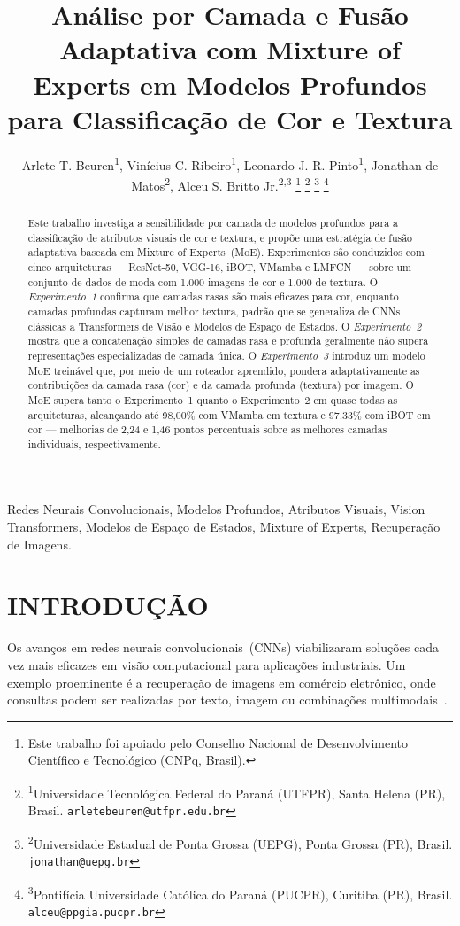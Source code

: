 \documentclass[letterpaper, 10 pt, conference]{ieeeconf}
\title{\LARGE \bf
Análise por Camada e Fusão Adaptativa com Mixture of Experts em Modelos
Profundos para Classificação de Cor e Textura
}
\author{
    Arlete T. Beuren\textsuperscript{1},
    Vinícius C. Ribeiro\textsuperscript{1},
    Leonardo J. R. Pinto\textsuperscript{1},
    Jonathan de Matos\textsuperscript{2},
    Alceu S. Britto Jr.\textsuperscript{2,3}%
    \thanks{Este trabalho foi apoiado pelo Conselho Nacional de
            Desenvolvimento Científico e Tecnológico (CNPq, Brasil).}%
    \thanks{\textsuperscript{1}Universidade Tecnológica Federal do Paraná
            (UTFPR), Santa Helena (PR), Brasil.
            \texttt{arletebeuren@utfpr.edu.br}}%
    \thanks{\textsuperscript{2}Universidade Estadual de Ponta Grossa (UEPG),
            Ponta Grossa (PR), Brasil.
            \texttt{jonathan@uepg.br}}%
    \thanks{\textsuperscript{3}Pontifícia Universidade Católica do Paraná
            (PUCPR), Curitiba (PR), Brasil.
            \texttt{alceu@ppgia.pucpr.br}}%
}
\begin{document}
\maketitle
\thispagestyle{empty}
\pagestyle{empty}

\begin{abstract}

Este trabalho investiga a sensibilidade por camada de modelos profundos
para a classificação de atributos visuais de cor e textura, e propõe uma
estratégia de fusão adaptativa baseada em Mixture of Experts~(MoE).
Experimentos são conduzidos com cinco arquiteturas — ResNet-50, VGG-16,
iBOT, VMamba e LMFCN — sobre um conjunto de dados de moda com 1.000
imagens de cor e 1.000 de textura.
O \emph{Experimento~1} confirma que camadas rasas são mais eficazes para
cor, enquanto camadas profundas capturam melhor textura, padrão que se
generaliza de CNNs clássicas a Transformers de Visão e Modelos de Espaço
de Estados.
O \emph{Experimento~2} mostra que a concatenação simples de camadas rasa e
profunda geralmente não supera representações especializadas de camada única.
O \emph{Experimento~3} introduz um modelo MoE treinável que, por meio de um
roteador aprendido, pondera adaptativamente as contribuições da camada rasa
(cor) e da camada profunda (textura) por imagem.
O MoE supera tanto o Experimento~1 quanto o Experimento~2 em quase todas as
arquiteturas, alcançando até 98,00\% com VMamba em textura e 97,33\% com
iBOT em cor — melhorias de 2,24 e 1,46 pontos percentuais sobre as melhores
camadas individuais, respectivamente.

\end{abstract}

\begin{IEEEkeywords}
Redes Neurais Convolucionais, Modelos Profundos, Atributos Visuais,
Vision Transformers, Modelos de Espaço de Estados, Mixture of Experts,
Recuperação de Imagens.
\end{IEEEkeywords}

\section{INTRODUÇÃO}

Os avanços em redes neurais convolucionais~(CNNs) viabilizaram soluções cada
vez mais eficazes em visão computacional para aplicações industriais.
Um exemplo proeminente é a recuperação de imagens em comércio eletrônico,
onde consultas podem ser realizadas por texto, imagem ou combinações
multimodais~\cite{b1}.
\end{document}
